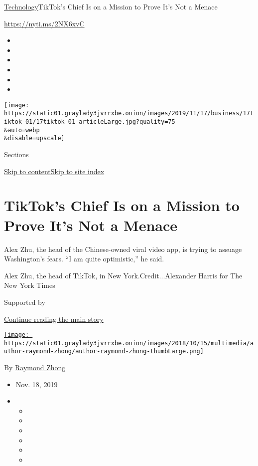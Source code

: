 \href{/section/technology}{Technology}\textbar{}TikTok's Chief Is on a
Mission to Prove It's Not a Menace

\url{https://nyti.ms/2NX6xvC}

\begin{itemize}
\item
\item
\item
\item
\item
\item
\end{itemize}

\texttt{[image: https://static01.graylady3jvrrxbe.onion/images/2019/11/17/business/17tiktok-01/17tiktok-01-articleLarge.jpg?quality=75\\\&auto=webp\\\&disable=upscale]}

Sections

\protect\hyperlink{site-content}{Skip to
content}\protect\hyperlink{site-index}{Skip to site index}

\hypertarget{tiktoks-chief-is-on-a-mission-to-prove-its-not-a-menace}{%
\section{TikTok's Chief Is on a Mission to Prove It's Not a
Menace}\label{tiktoks-chief-is-on-a-mission-to-prove-its-not-a-menace}}

Alex Zhu, the head of the Chinese-owned viral video app, is trying to
assuage Washington's fears. ``I am quite optimistic,'' he said.

Alex Zhu, the head of TikTok, in New York.Credit...Alexander Harris for
The New York Times

Supported by

\protect\hyperlink{after-sponsor}{Continue reading the main story}

\href{https://www.nytimes3xbfgragh.onion/by/raymond-zhong}{\texttt{[image: https://static01.graylady3jvrrxbe.onion/images/2018/10/15/multimedia/author-raymond-zhong/author-raymond-zhong-thumbLarge.png]}}

By \href{https://www.nytimes3xbfgragh.onion/by/raymond-zhong}{Raymond
Zhong}

\begin{itemize}
\item
  Nov. 18, 2019
\item
  \begin{itemize}
  \item
  \item
  \item
  \item
  \item
  \item
  \end{itemize}
\end{itemize}

